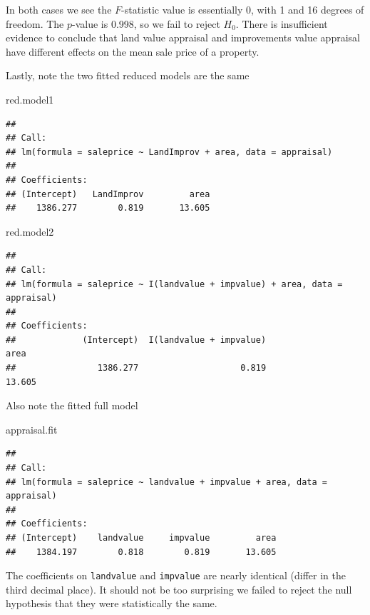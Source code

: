 \documentclass[
]{book}
\newenvironment{Shaded}{\begin{snugshade}}{\end{snugshade}}
\newcommand{\NormalTok}[1]{#1}
\begin{document}
In both cases we see the \(F\)-statistic value is essentially 0, with 1 and 16 degrees of freedom. The \(p\)-value is 0.998, so we fail to reject \(H_0\). There is insufficient evidence to conclude that land value appraisal and improvements value appraisal have different effects on the mean sale price of a property.

Lastly, note the two fitted reduced models are the same

\begin{Shaded}
\begin{Highlighting}[]
\NormalTok{red.model1}
\end{Highlighting}
\end{Shaded}

\begin{verbatim}
## 
## Call:
## lm(formula = saleprice ~ LandImprov + area, data = appraisal)
## 
## Coefficients:
## (Intercept)   LandImprov         area  
##    1386.277        0.819       13.605
\end{verbatim}

\begin{Shaded}
\begin{Highlighting}[]
\NormalTok{red.model2}
\end{Highlighting}
\end{Shaded}

\begin{verbatim}
## 
## Call:
## lm(formula = saleprice ~ I(landvalue + impvalue) + area, data = appraisal)
## 
## Coefficients:
##             (Intercept)  I(landvalue + impvalue)                     area  
##                1386.277                    0.819                   13.605
\end{verbatim}

Also note the fitted full model

\begin{Shaded}
\begin{Highlighting}[]
\NormalTok{appraisal.fit}
\end{Highlighting}
\end{Shaded}

\begin{verbatim}
## 
## Call:
## lm(formula = saleprice ~ landvalue + impvalue + area, data = appraisal)
## 
## Coefficients:
## (Intercept)    landvalue     impvalue         area  
##    1384.197        0.818        0.819       13.605
\end{verbatim}

The coefficients on \texttt{landvalue} and \texttt{impvalue} are nearly identical (differ in the third decimal place). It should not be too surprising we failed to reject the null hypothesis that they were statistically the same.
\end{document}
